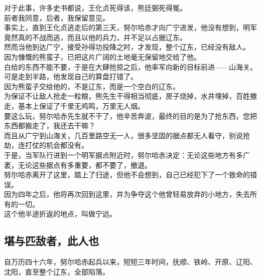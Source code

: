 \begin{multicols}{\theparacolNo}
对于此事，许多史书都说，王化贞死得该，熊廷弼死得冤。\\

前者我同意，后者，我保留意见。\\

事实上，直到王化贞逃走后的第三天，努尔哈赤才向广宁进发，他没有想到，明军竟然真的不战而逃，而且以他的兵力，并不足以占据辽东。\\

然而当他到达广宁，接受孙得功投降之时，才发现，整个辽东，已经没有敌人。\\

因为慷慨的熊蛮子，已把这片广阔的土地毫无保留地交给了他。\\

白给的东西不能不要，于是在大肆抢掠之后，他率军向新的目标前进——山海关。\\

可是走到半路，他发现自己的算盘打错了。\\

因为熊蛮子交给他的，不是辽东，而是一个空白的辽东。\\

为保证不让敌人抢走一粒粮，熊先生干得相当彻底，房子烧掉，水井埋掉，百姓撤走，基本上保证了千里无鸡鸣，万里无人烟。\\

要这么玩，努尔哈赤先生就不干了，他辛苦奔波，最终的目的是为了抢东西，您把东西都搬走了，我还去干嘛？\\

而且从广宁到山海关，几百里路空无一人，很多坚固的据点都无人看守，别说抢劫，连打仗的机会都没有。\\

于是，当军队行进到一个明军据点附近时，努尔哈赤决定：无论这些地方有多广袤，无论这些据点有多重要，都不要了，撤退。\\

努尔哈赤离开了这里，踏上了归途，但他不会想到，自己已经犯下了一个致命的错误。\\

因为四年之后，他将再次回到这里，并为争夺这个他曾轻易放弃的小地方，失去所有的一切。\\

这个他半途折返的地点，叫做宁远。\\

\subsection{堪与匹敌者，此人也}
自万历四十六年，努尔哈赤起兵以来，短短三年时间，抚顺、铁岭、开原、辽阳、沈阳，直至整个辽东，全部陷落。\\


\end{multicols}

